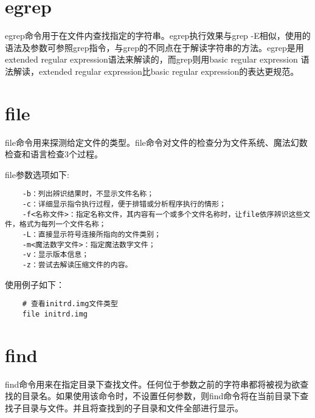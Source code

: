 \documentclass[a4paper,left=2.5cm,right=2.5cm,11pt]{article}
\begin{document}
\section{egrep}
	egrep命令用于在文件内查找指定的字符串。egrep执行效果与grep -E相似，使用的语法及参数可参照grep指令，与grep的不同点在于解读字符串的方法。egrep是用extended regular expression语法来解读的，而grep则用basic regular expression 语法解读，extended regular expression比basic regular expression的表达更规范。

\section{file}
	file命令用来探测给定文件的类型。file命令对文件的检查分为文件系统、魔法幻数检查和语言检查3个过程。\par

	file参数选项如下:
	\begin{lstlisting}
	-b：列出辨识结果时，不显示文件名称； 
	-c：详细显示指令执行过程，便于排错或分析程序执行的情形； 
	-f<名称文件>：指定名称文件，其内容有一个或多个文件名称时，让file依序辨识这些文件，格式为每列一个文件名称； 
	-L：直接显示符号连接所指向的文件类别； 
	-m<魔法数字文件>：指定魔法数字文件； 
	-v：显示版本信息； 
	-z：尝试去解读压缩文件的内容。
	\end{lstlisting}

	使用例子如下：
	\begin{lstlisting}
	# 查看initrd.img文件类型
	file initrd.img
	\end{lstlisting}

\section{find}
	find命令用来在指定目录下查找文件。任何位于参数之前的字符串都将被视为欲查找的目录名。如果使用该命令时，不设置任何参数，则find命令将在当前目录下查找子目录与文件。并且将查找到的子目录和文件全部进行显示。\par
\end{document}
